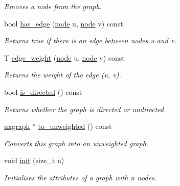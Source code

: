 \begin{DoxyCompactItemize}
\begin{DoxyCompactList}\small\item\em Rmoves a node from the graph. \end{DoxyCompactList}\item 
bool \hyperlink{classlgraph_1_1utils_1_1wdgraph_ac74f172c5a6bdbf56ac5a4013fae880a}{has\-\_\-edge} (\hyperlink{namespacelgraph_1_1utils_a7bd66ede3805ef121bc2835bd48de0cf}{node} u, \hyperlink{namespacelgraph_1_1utils_a7bd66ede3805ef121bc2835bd48de0cf}{node} v) const 
\begin{DoxyCompactList}\small\item\em Returns true if there is an edge between nodes {\itshape u} and {\itshape v}. \end{DoxyCompactList}\item 
T \hyperlink{classlgraph_1_1utils_1_1wdgraph_a1d86f87f61f47af9251945c14385c4e4}{edge\-\_\-weight} (\hyperlink{namespacelgraph_1_1utils_a7bd66ede3805ef121bc2835bd48de0cf}{node} u, \hyperlink{namespacelgraph_1_1utils_a7bd66ede3805ef121bc2835bd48de0cf}{node} v) const 
\begin{DoxyCompactList}\small\item\em Returns the weight of the edge ({\itshape u}, {\itshape v}). \end{DoxyCompactList}\item 
bool \hyperlink{classlgraph_1_1utils_1_1wdgraph_a5eee58626ec0aa8428436a859d601741}{is\-\_\-directed} () const 
\begin{DoxyCompactList}\small\item\em Returns whether the graph is directed or undirected. \end{DoxyCompactList}\item 
\hyperlink{classlgraph_1_1utils_1_1uxgraph}{uxgraph} $\ast$ \hyperlink{classlgraph_1_1utils_1_1wdgraph_a0282369d3514119684e6ca6668e4514b}{to\-\_\-unweighted} () const 
\begin{DoxyCompactList}\small\item\em Converts this graph into an unweighted graph. \end{DoxyCompactList}\item 
void \hyperlink{classlgraph_1_1utils_1_1wxgraph_a566ae9fe69209230ef159ed350ab8f7f}{init} (size\-\_\-t n)
\begin{DoxyCompactList}\small\item\em Initialises the attributes of a graph with {\itshape n} nodes. \end{DoxyCompactList}\item 

\end{DoxyCompactItemize}
